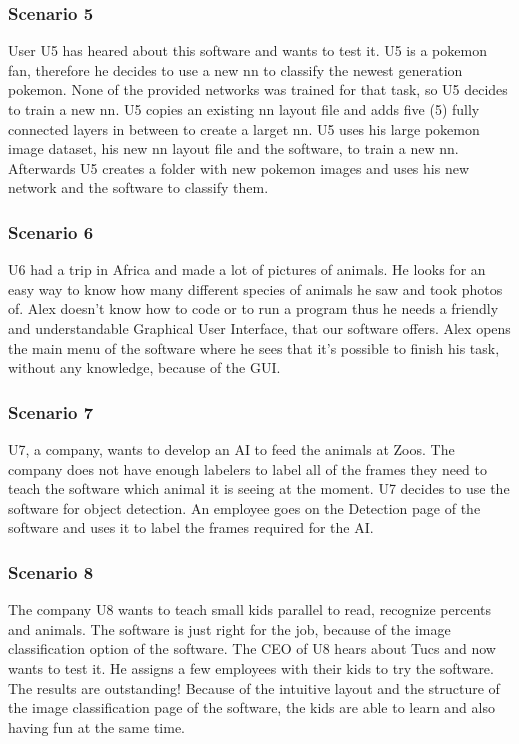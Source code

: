 \documentclass[parskip=full]{scrartcl}
\begin{document}
\subsubsection{Scenario 5}
User U5 has heared about this software and wants to test it.
U5 is a pokemon fan, therefore he decides to use a new \gls{nn} to classify the newest generation pokemon. None of the provided networks was trained for that task, so U5 decides to train a new \gls{nn}. U5 copies an existing \gls{nn} layout file and adds five (5) fully connected layers in between to create a larget \gls{nn}. U5 uses his large pokemon image dataset, his new \gls{nn} layout file and the software, to train a new \gls{nn}. 
Afterwards U5 creates a folder with new pokemon images and uses his new network and the software to classify them.
\subsubsection{Scenario 6}
U6 had a trip in Africa and made a lot of pictures of animals. He looks for an easy way to know how many different species of animals he saw and took photos of. Alex doesn't know how to code or to run a program thus he needs a friendly and understandable Graphical User Interface, that our software offers. Alex opens the main menu of the software where he sees that it's possible to finish his task, without any knowledge, because of the GUI. 
\clearpage
\subsubsection{Scenario 7}
U7, a company, wants to develop an AI to feed the animals at Zoos. The company does not have enough labelers to label all of the frames they need to teach the software which animal it is seeing at the moment. U7 decides to use the software for object detection. An employee goes on the Detection page of the software and uses it to label the frames required for the AI.
\subsubsection{Scenario 8}
The company U8 wants to teach small kids parallel to read, recognize percents and animals. The software is just right for the job, because of the \gls{image classification} option of the software. The CEO of U8 hears about Tucs and now wants to test it. He assigns a few employees with their kids to try the software. The results are outstanding! Because of the intuitive layout and the structure of the \gls{image classification} page of the software, the kids are able to learn and also having fun at the same time.
\clearpage
\end{document}
